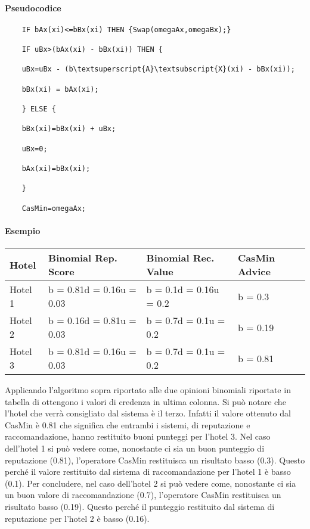 \documentclass{report}
\begin{document}
	\hypertarget{header-n195}{%
		\paragraph{Pseudocodice}\label{header-n195}}
	
	\begin{lstlisting}
	IF bAx(xi)<=bBx(xi) THEN {Swap(omegaAx,omegaBx);}
	
	IF uBx>(bAx(xi) - bBx(xi)) THEN {
	
	uBx=uBx - (b\textsuperscript{A}\textsubscript{X}(xi) - bBx(xi));
	
	bBx(xi) = bAx(xi);
	
	} ELSE {
	
	bBx(xi)=bBx(xi) + uBx;
	
	uBx=0;
	
	bAx(xi)=bBx(xi);
	
	}
	
	CasMin=omegaAx;
	\end{lstlisting}
	
	\hypertarget{header-n197}{%
		\paragraph{Esempio}\label{header-n197}}
	
	\begin{longtable}[]{@{}llll@{}}
		\toprule
		Hotel & Binomial Rep. Score & Binomial Rec. Value & CasMin
		Advice\tabularnewline
		\midrule
		\endhead
		Hotel 1 & b = 0.81d = 0.16u = 0.03 & b = 0.1d = 0.16u = 0.2 & b =
		0.3\tabularnewline
		Hotel 2 & b = 0.16d = 0.81u = 0.03 & b = 0.7d = 0.1u = 0.2 & b =
		0.19\tabularnewline
		Hotel 3 & b = 0.81d = 0.16u = 0.03 & b = 0.7d = 0.1u = 0.2 & b =
		0.81\tabularnewline
		\bottomrule
	\end{longtable}
	
	Applicando l'algoritmo sopra riportato alle due opinioni binomiali
	riportate in tabella di ottengono i valori di credenza in ultima
	colonna. Si può notare che l'hotel che verrà consigliato dal sistema è
	il terzo. Infatti il valore ottenuto dal CasMin è 0.81 che significa che
	entrambi i sistemi, di reputazione e raccomandazione, hanno restituito
	buoni punteggi per l'hotel 3. Nel caso dell'hotel 1 si può vedere come,
	nonostante ci sia un buon punteggio di reputazione (0.81), l'operatore
	CasMin restituisca un risultato basso (0.3). Questo perché il valore
	restituito dal sistema di raccomandazione per l'hotel 1 è basso (0.1).
	Per concludere, nel caso dell'hotel 2 si può vedere come, nonostante ci
	sia un buon valore di raccomandazione (0.7), l'operatore CasMin
	restituisca un risultato basso (0.19). Questo perché il punteggio
	restituito dal sistema di reputazione per l'hotel 2 è basso (0.16).
	
\end{document}
